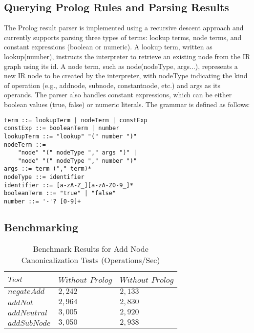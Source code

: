 \subsection{Querying Prolog Rules and Parsing Results}
The Prolog result parser is implemented using a recursive descent approach and currently supports parsing three types of terms: lookup terms, node terms, and constant expressions (boolean or numeric). A lookup term, written as lookup(number), instructs the interpreter to retrieve an existing node from the IR graph using its id. A node term, such as node(nodeType, args...), represents a new IR node to be created by the interpreter, with nodeType indicating the kind of operation (e.g., addnode, subnode, constantnode, etc.) and args as its operands. The parser also handles constant expressions, which can be either boolean values (true, false) or numeric literals. The grammar is defined as follows:
\begin{lstlisting}
term ::= lookupTerm | nodeTerm | constExp  
constExp ::= booleanTerm | number  
lookupTerm ::= "lookup" "(" number ")"  
nodeTerm ::= 
    "node" "(" nodeType "," args ")" | 
    "node" "(" nodeType "," number ")"  
args ::= term ("," term)*  
nodeType ::= identifier
identifier ::= [a-zA-Z_][a-zA-Z0-9_]*  
booleanTerm ::= "true" | "false"  
number ::= '-'? [0-9]+
\end{lstlisting}

\subsection{Benchmarking}

\begin{table}[h]
    \centering
    \fontsize{9pt}{9pt}
    \begin{tabular}{|l|l|l|}
        \hline
        $Test$ & $Without$ $Prolog$ & $Without$ $Prolog$ \\
        \hline
        $negateAdd$ & $2,242$ & $2,133$ \\
        $addNot$ & $2,964$ & $2,830$ \\
        $addNeutral$ & $3,005$ & $2,920$ \\
        $addSubNode$ & $3,050$ & $2,938$ \\
        \hline
    \end{tabular}
    \caption{Benchmark Results for Add Node Canonicalization Tests (Operations/Sec)}
    \label{table:Canonicalization}
\end{table} 


